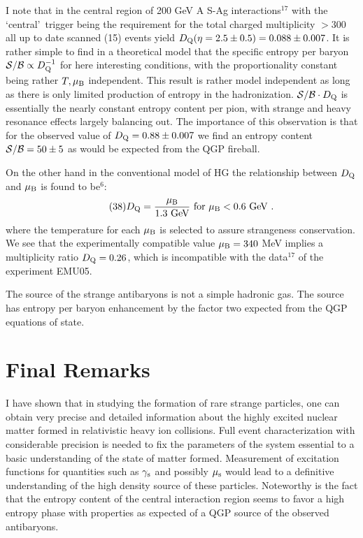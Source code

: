 \begin{mdframed}[linecolor=gray,roundcorner=12pt,backgroundcolor=Dandelion!15,linewidth=1pt,leftmargin=0cm,rightmargin=0cm,topline=true,bottomline=true,skipabove=12pt]
I note that in the central region of 200 GeV A S-Ag interactions$^{17}$
with the \lq central\rq\ trigger being the requirement for the total charged
multiplicity $> 300$ all up to date scanned (15) events yield $D_{\rm
Q}(\eta=2.5\pm0.5)=0.088\pm0.007$. It is rather simple to find in a
theoretical model that the specific entropy per baryon ${\cal S/B}\propto
D_{\rm Q}^{-1}$ for here interesting conditions, with the proportionality
constant being rather $T,\mu_{\rm B}$ independent. This result is rather
model independent as long as there is only limited production of entropy
in the hadronization. ${\cal S/B}\cdot D_{\rm Q}$ is essentially the
nearly constant entropy content per pion, with strange and heavy
resonance effects largely balancing out. The importance of this
observation is that for the observed value of $D_{\rm Q}=0.88\pm0.007$ we
find an entropy content${\cal S/B}=50\pm5$ as would be expected from the
QGP fireball. 

On the other hand in the conventional model of HG the relationship
between $D_{\rm Q}$ and $\mu_{\rm B}$ is found to be$^{6}$:
\begin{equation}
\tag{38}\hfil D_{\rm Q}= {\mu_{\rm B}\over\mbox{1.3 GeV}}\ \mbox{for }
\mu_{\rm B}<0.6 \mbox{ GeV}\ .
\end{equation}
where the temperature for each $\mu_{\rm B}$ is selected to assure
strangeness conservation. We see that the experimentally compatible value
$\mu_{\rm B}=340$ MeV implies a multiplicity ratio $D_{\rm Q}=0.26$,
which is incompatible with the data$^{17}$ of the experiment EMU05.
 
The source of the strange antibaryons is not a simple hadronic gas. The
source has entropy per baryon enhancement by the factor two expected from
the QGP equations of state.
 
\section*{Final Remarks}
I have shown that in studying the formation of rare strange particles,
one can obtain very precise and detailed information about the highly
excited nuclear matter formed in relativistic heavy ion collisions. Full
event characterization with considerable precision is needed to fix the
parameters of the system essential to a basic understanding of the state
of matter formed. Measurement of excitation functions for quantities such
as $\gamma_{\rm s}$ and possibly $\mu_{\rm s}$ would lead to a definitive
understanding of the high density source of these particles. Noteworthy
is the fact that the entropy content of the central interaction region
seems to favor a high entropy phase with properties as expected of a QGP
source of the observed antibaryons.
 

\end{mdframed}
